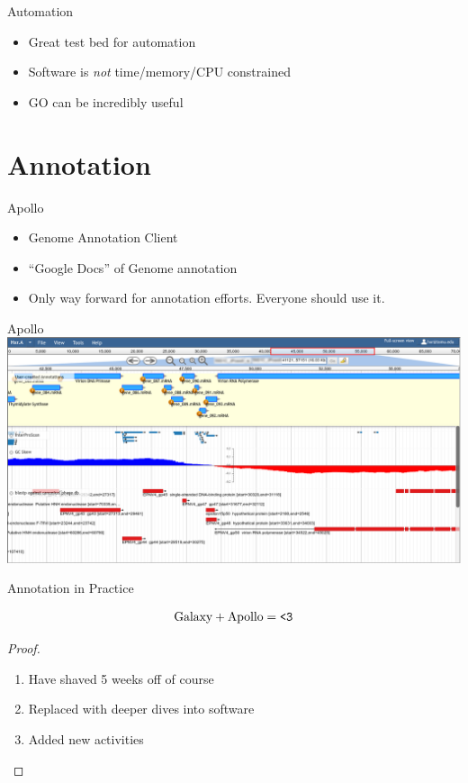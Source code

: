 \documentclass[12pt]{beamer}
\begin{document}
\begin{frame}{Automation}
    \begin{itemize}
        \item Great test bed for automation
        \item Software is \emph{not} time/memory/CPU constrained
        \item GO can be incredibly useful
    \end{itemize}
\end{frame}


\section{Annotation}


\begin{frame}{Apollo}
    \begin{itemize}
        \item Genome Annotation Client
        \item ``Google Docs'' of Genome annotation
        \item Only way forward for annotation efforts. Everyone should use it.
    \end{itemize}
\end{frame}

\begin{frame}{Apollo}
    \centering
    \includegraphics[width=\textwidth]{./apollo.png}
\end{frame}

\begin{frame}{Annotation in Practice}
    \begin{theorem}
        \begin{equation}
            \text{Galaxy} + \text{Apollo} = \text{\texttt{<3}}
        \end{equation}
    \end{theorem}
    \begin{proof}
        \begin{enumerate}
            \item Have shaved 5 weeks off of course
            \item Replaced with deeper dives into software
            \item Added new activities
        \end{enumerate}
    \end{proof}
\end{frame}
\end{document}
